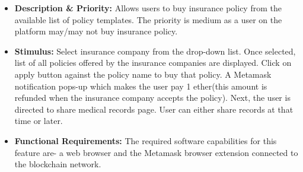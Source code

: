 \begin{enumerate}
	   \begin{itemize}
	       \item \textbf{Description \& Priority:} Allows users to buy insurance policy from the available list of policy templates. The priority is medium as a user on the platform may/may not buy insurance policy.   
	       \item \textbf{Stimulus:} Select insurance company from the drop-down list. Once selected, list of all policies offered by the insurance companies are displayed. Click on apply button against the policy name to buy that policy. A Metamask notification pops-up which makes the user pay 1 ether(this amount is refunded when the insurance company accepts the policy). Next, the user is directed to share medical records page. User can either share records at that time or later. 
	       \item \textbf{Functional Requirements:} The required software capabilities for this feature are- a web browser and the Metamask browser extension connected to the blockchain network.
	   \end{itemize}   	      
\end{enumerate}
